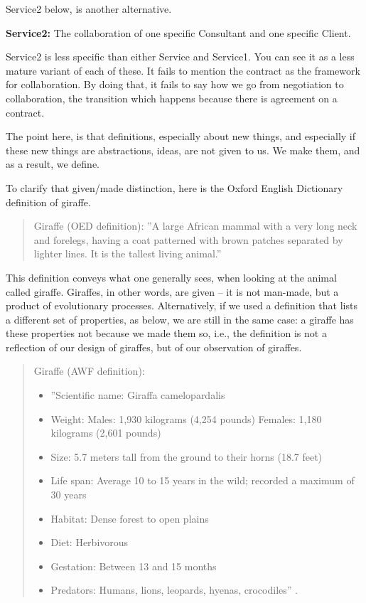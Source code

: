 Service2 below, is another alternative.

\begin{svgraybox}
\textbf{Service2:} The collaboration of one specific Consultant and one specific Client.
\end{svgraybox}

Service2 is less specific than either Service and Service1. You can see it as a less mature variant of each of these. It fails to mention the contract as the framework for collaboration. By doing that, it fails to say how we go from negotiation to collaboration, the transition which happens because there is agreement on a contract.

The point here, is that definitions, especially about new things, and especially if these new things are abstractions, ideas, are not given to us. We make them, and as a result, we define.

To clarify that given/made distinction, here is the Oxford English Dictionary definition of giraffe.

\begin{quote}
Giraffe (OED definition): ''A large African mammal with a very long neck and forelegs, having a coat patterned with brown patches separated by lighter lines. It is the tallest living animal.'' \cite{def-giraffe}
\end{quote}

This definition conveys what one generally sees, when looking at the animal called giraffe. Giraffes, in other words, are given -- it is not man-made, but a product of evolutionary processes. Alternatively, if we used a definition that lists a different set of properties, as below, we are still in the same case: a giraffe has these properties not because we made them so, i.e., the definition is not a reflection of our design of giraffes, but of our observation of giraffes.

\begin{quote}
Giraffe (AWF definition):
\begin{itemize}
\item ''Scientific name: Giraffa camelopardalis
\item Weight: Males: 1,930 kilograms (4,254 pounds) Females: 1,180 kilograms (2,601 pounds)
\item Size: 5.7 meters tall from the ground to their horns (18.7 feet)
\item Life span: Average 10 to 15 years in the wild; recorded a maximum of 30 years
\item Habitat: Dense forest to open plains
\item Diet: Herbivorous
\item Gestation: Between 13 and 15 months
\item Predators: Humans, lions, leopards, hyenas, crocodiles'' \cite{awf-giraffe}.
\end{itemize}
\end{quote}

